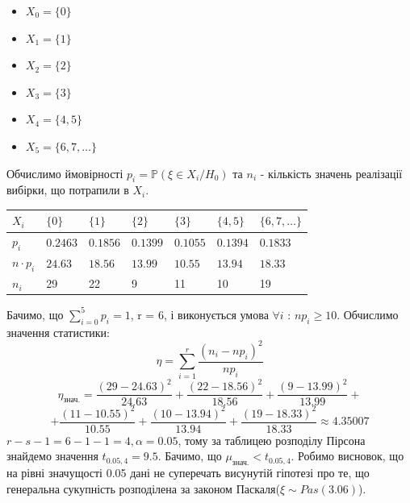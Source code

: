 \documentclass{article}
\begin{document}
\begin{multicols}{2}
  \begin{itemize}
    \item $X_0 = \{0\}$
    \item $X_1 = \{1\}$
    \item $X_2 = \{2\}$
    \item $X_3 = \{3\}$
    \item $X_4 = \{4, 5\}$
    \item $X_5 = \{6, 7, \dots\}$
  \end{itemize}
\end{multicols}
\newpage
Обчислимо ймовірності $p_i = \mathbb{P}(\xi \in X_i/H_0)$ та 
$n_i$ - кількість значень реалізації вибірки, що потрапили в 
$X_i$.
\newline
\begin{tabular}{|l|l|l|l|l|l|l|}
  \hline
  $X_i$ & $\{0\}$ & $\{1\}$ & $\{2\}$ & $\{3\}$ & $\{4, 5\}$ & 
  $\{6, 7, \dots\}$ \\
  \hline
  $p_i$ & $0.2463$ & $0.1856$ & $0.1399$ & $0.1055$ & 
  $0.1394$ & $0.1833$\\
  \hline
  $n\cdot p_i$ & $24.63$ & $18.56$ & $13.99$ & $10.55$ & 
  $13.94$ & $18.33$\\
  \hline
  $n_i$ & 29 & 22 & 9 & 11 & 10 & 19 \\
  \hline
\end{tabular}
\newline
\newline
Бачимо, що $\sum_{i = 0}^{5}p_i = 1$, r = 6, і виконується умова 
\newline
$\forall i$ : 
$np_i \geq 10$.
Обчислимо значення статистики:
$$\eta = \sum_{i=1}^r\frac{(n_i - np_i)^2}{np_i}$$
$$\eta_\text{знач.} = \frac{(29 - 24.63)^2}{24.63} + 
\frac{(22 - 18.56)^2}{18.56} + \frac{(9 - 13.99)^2}{13.99} + $$
$$+ \frac{(11 - 10.55)^2}{10.55} + \frac{(10 - 13.94)^2}{13.94} + 
\frac{(19 - 18.33)^2}{18.33} \approx 4.35007$$
$r - s - 1 = 6 - 1 - 1 = 4, \alpha = 0.05$, тому за таблицею розподілу 
Пірсона знайдемо значення $t_{0.05, 4} = 9.5$. Бачимо, що 
$\mu_\text{знач.} < t_{0.05, 4}$. Робимо висновок, що на рівні 
значущості 0.05 дані не суперечать висунутій гіпотезі про те, що 
генеральна сукупність розподілена за законом Паскаля($\xi 
\sim Pas(3.06)$).
\newpage
\end{document}

